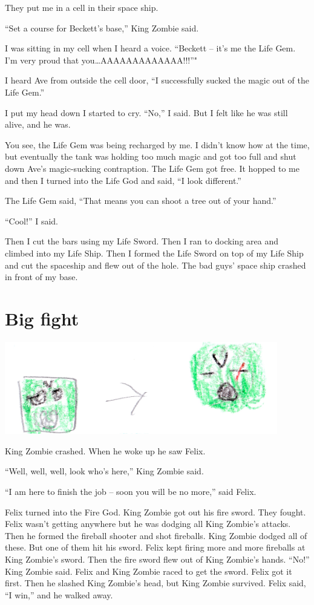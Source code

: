 \documentclass[letterpaper, oneside, 12pt]{krantz}
\begin{document}
They put me in a cell in their space ship.

``Set a course for Beckett's base,'' King Zombie said.

I was sitting in my cell when I heard a voice. ``Beckett -- it's me the
Life Gem. I'm very proud that you\ldots{}AAAAAAAAAAAAA!!!''"

I heard Ave from outside the cell door, ``I successfully sucked the
magic out of the Life Gem.''

I put my head down I started to cry. ``No,'' I said. But I felt like he
was still alive, and he was.

You see, the Life Gem was being recharged by me. I didn't know how at
the time, but eventually the tank was holding too much magic and got too
full and shut down Ave's magic-sucking contraption. The Life Gem got
free. It hopped to me and then I turned into the Life God and said, ``I
look different.''

The Life Gem said, ``That means you can shoot a tree out of your hand.''

``Cool!'' I said.

Then I cut the bars using my Life Sword. Then I ran to docking area and
climbed into my Life Ship. Then I formed the Life Sword on top of my
Life Ship and cut the spaceship and flew out of the hole. The bad guys'
space ship crashed in front of my base.

\hypertarget{big-fight}{%
\section{Big fight}\label{big-fight}}

\includegraphics[width=4.6875in,height=\textheight]{img/four-bad-guys/greenheads.jpg}

King Zombie crashed. When he woke up he saw Felix.

``Well, well, well, look who's here,'' King Zombie said.

``I am here to finish the job -- soon you will be no more,'' said Felix.

Felix turned into the Fire God. King Zombie got out his fire sword. They
fought. Felix wasn't getting anywhere but he was dodging all King
Zombie's attacks. Then he formed the fireball shooter and shot
fireballs. King Zombie dodged all of these. But one of them hit his
sword. Felix kept firing more and more fireballs at King Zombie's sword.
Then the fire sword flew out of King Zombie's hands. ``No!'' King Zombie
said. Felix and King Zombie raced to get the sword. Felix got it first.
Then he slashed King Zombie's head, but King Zombie survived. Felix
said, ``I win,'' and he walked away.
\end{document}
